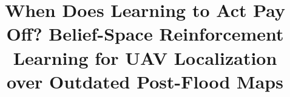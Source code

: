 \documentclass[conference]{IEEEtran}
\begin{document}
\title{When Does Learning to Act Pay Off? Belief-Space Reinforcement Learning for UAV Localization over Outdated Post-Flood Maps}
\author{}
\maketitle














\appendix

\end{document}
